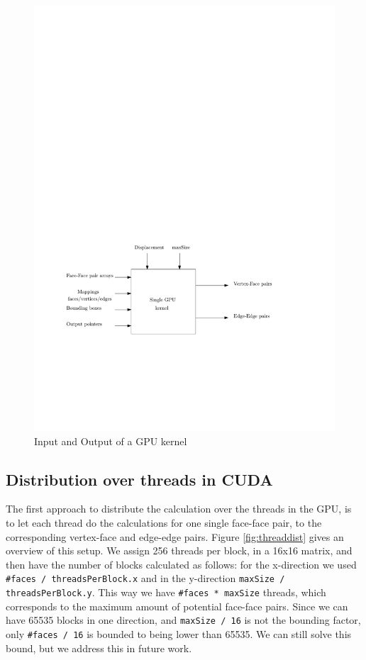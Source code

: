 \begin{figure}
	\includegraphics{threadbox.pdf}
	\caption{Input and Output of a GPU kernel}
	\label{fig:kernel}
\end{figure}

\subsection{Distribution over threads in CUDA}
The first approach to distribute the calculation over the threads in the GPU, is to let each thread do the calculations for one single face-face pair, to the corresponding vertex-face and edge-edge pairs. Figure \ref{fig:threaddist} gives an overview of this setup. We assign 256 threads per block, in a 16x16 matrix, and then have the number of blocks calculated as follows: for the x-direction we used \texttt{\#faces / threadsPerBlock.x} and in the y-direction \texttt{maxSize / threadsPerBlock.y}. This way we have \texttt{\#faces * maxSize} threads, which corresponds to the maximum amount of potential face-face pairs. Since we can have 65535 blocks in one direction, and \texttt{maxSize / 16} is not the bounding factor, only \texttt{\#faces / 16} is bounded to being lower than 65535. We can still solve this bound, but we address this in future work.\\

